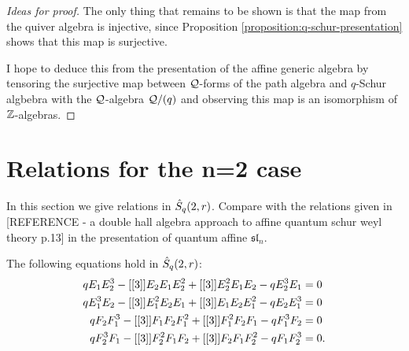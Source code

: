 \documentclass[a4paper, 11pt]{report}
\begin{document}
\begin{proof}[Ideas for proof]
The only thing that remains to be shown is that the map from the quiver algebra is injective, since Proposition \ref{proposition:q-schur-presentation} shows that this map is surjective.

I hope to deduce this from the presentation of the affine generic algebra by tensoring the surjective map between $\qfrac$-forms of the path algebra and $q$-Schur algbebra with the $\qfrac$-algebra $\qfrac/{(q)}$ and observing this map is an isomorphism of $\integers$-algebras.
\end{proof}


\section{Relations for the n=2 case}

In this section we give relations in $\qschur[2,r]$. Compare with the relations given in {\color{red}[REFERENCE - a double hall algebra approach to affine quantum schur weyl theory p.13]} in the presentation of quantum affine $\mathfrak{sl}_n$.

\begin{lemma}\label{lemma:period-2-q-relations}
The following equations hold in $\qschur[2,r]$:
\begin{align*}
qE_1 E_2^3 -\qint{3}E_2 E_1 E_2^2 +\qint{3}E_2^2 E_1 E_2 -qE_2^3 E_1 &= 0\\
qE_1^3 E_2 -\qint{3}E_1^2 E_2 E_1 +\qint{3}E_1 E_2 E_1^2 -qE_2 E_1^3 &= 0\\
qF_2 F_1^3 -\qint{3}F_1 F_2 F_1^2 +\qint{3}F_1^2 F_2 F_1 -qF_1^3 F_2 &= 0\\
qF_2^3 F_1 -\qint{3}F_2^2 F_1 F_2 +\qint{3}F_2 F_1 F_2^2 -qF_1 F_2^3 &= 0.
\end{align*}
\end{lemma}
\end{document}

